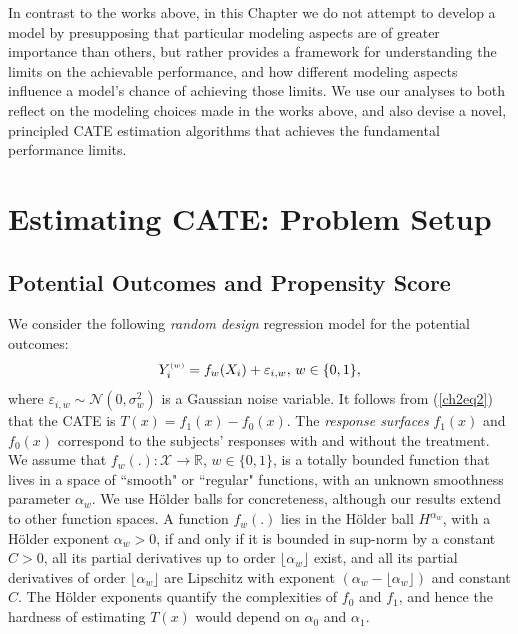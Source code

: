 \documentclass [PhD] {uclathes}
\begin{document}
In contrast to the works above, in this Chapter we do not attempt to develop a model by presupposing that particular modeling aspects are of greater importance than others, but rather provides a framework for understanding the limits on the achievable performance, and how different modeling aspects influence a model's chance of achieving those limits. We use our analyses to both reflect on the modeling choices made in the works above, and also devise a novel, principled CATE estimation algorithms that achieves the fundamental performance limits.  

\section{Estimating CATE: Problem Setup} 
\label{ch2sec3}
\subsection{Potential Outcomes and Propensity Score}
\label{pO22}
We consider the following \textit{random design} regression model for the potential outcomes:
\begin{equation}
Y^{\mbox{\tiny $(w)$}}_i = f_{w}(X_i) + \varepsilon_{i,w},\, w \in \{0,1\},  
\label{ch2eq3}
\end{equation}
where $\varepsilon_{i,w} \sim \mathcal{N}(0,\sigma^2_{w})$ is a Gaussian noise variable. It follows from (\ref{ch2eq2}) that the CATE is $T(x) = f_{1}(x)-f_{0}(x)$. The \textit{response surfaces} $f_{1}(x)$ and $f_{0}(x)$ correspond to the subjects' responses with and without the treatment. We assume that $f_{w}(.): \mathcal{X} \rightarrow \mathbb{R}$, $w \in \{0,1\}$, is a totally bounded function that lives in a space of ``smooth" or ``regular" functions, with an unknown smoothness parameter $\alpha_{w}$. We use H\"older balls for concreteness, although our results extend to other function spaces. A function $f_{w}(.)$ lies in the H\"older ball $H^{\alpha_{w}}$, with a H\"older exponent $\alpha_{w} > 0$, if and only if it is bounded in sup-norm by a constant $C > 0$, all its partial derivatives up to order $\lfloor \alpha_{w} \rfloor$ exist, and all its partial derivatives of order $\lfloor \alpha_{w} \rfloor$ are Lipschitz with exponent $(\alpha_{w}-\lfloor \alpha_{w} \rfloor)$ and constant $C$. The H\"older exponents quantify the complexities of $f_0$ and $f_1$, and hence the hardness of estimating $T(x)$ would depend on $\alpha_{0}$ and $\alpha_{1}$. 
\end{document}
